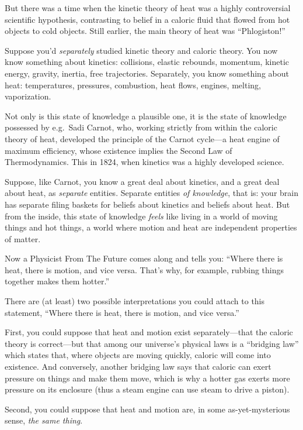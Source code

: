 {
 But there was a time when the kinetic theory of heat was a highly
controversial scientific hypothesis, contrasting to belief in a caloric
fluid that flowed from hot objects to cold objects. Still earlier, the
main theory of heat was
``Phlogiston!''}

{
 Suppose you'd \textit{separately} studied kinetic
theory and caloric theory. You now know something about kinetics:
collisions, elastic rebounds, momentum, kinetic energy, gravity,
inertia, free trajectories. Separately, you know something about heat:
temperatures, pressures, combustion, heat flows, engines, melting,
vaporization.}

{
 Not only is this state of knowledge a plausible one, it is the
state of knowledge possessed by e.g.~Sadi Carnot, who, working strictly
from within the caloric theory of heat, developed the principle of the
Carnot cycle---a heat engine of maximum efficiency, whose existence
implies the Second Law of Thermodynamics. This in 1824, when kinetics
was a highly developed science.}

{
 Suppose, like Carnot, you know a great deal about kinetics, and a
great deal about heat, as \textit{separate} entities. Separate entities
\textit{of knowledge}, that is: your brain has separate filing baskets
for beliefs about kinetics and beliefs about heat. But from the inside,
this state of knowledge \textit{feels} like living in a world of moving
things and hot things, a world where motion and heat are independent
properties of matter.}

{
 Now a Physicist From The Future comes along and tells you:
``Where there is heat, there is motion, and vice
versa. That's why, for example, rubbing things together
makes them hotter.''}

{
 There are (at least) two possible interpretations you could attach
to this statement, ``Where there is heat, there is
motion, and vice versa.''}

{
 First, you could suppose that heat and motion exist
separately---that the caloric theory is correct---but that among our
universe's physical laws is a
``bridging law'' which states that,
where objects are moving quickly, caloric will come into existence. And
conversely, another bridging law says that caloric can exert pressure
on things and make them move, which is why a hotter gas exerts more
pressure on its enclosure (thus a steam engine can use steam to drive a
piston).}

{
 Second, you could suppose that heat and motion are, in some
as-yet-mysterious sense, \textit{the same thing}.}

